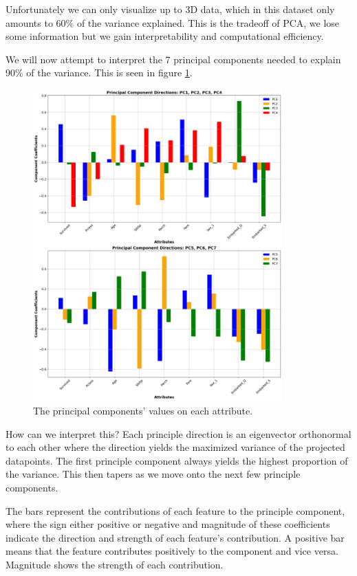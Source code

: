 \documentclass[twoside,11pt]{article}
\begin{document}
Unfortunately we can only visualize up to 3D data, which in this dataset only amounts to 60\% of the variance explained. This is the tradeoff of PCA, we lose some information but we gain interpretability and computational efficiency.

We will now attempt to interpret the 7 principal components needed to explain 90\% of the variance. This is seen in figure \ref{figure:principal-components}.
    
\begin{figure}[h!]
	\centering
	\includegraphics[height=12cm]{analysis_files/analysis_11_1.png}
	\caption{The principal components' values on each attribute.}
	\label{figure:principal-components}
\end{figure}
    
How can we interpret this? Each principle direction is an eigenvector orthonormal to each other where the direction yields the maximized variance of the projected datapoints. The first principle component always yields the highest proportion of the variance. This then tapers as we move onto the next few principle components.

The bars represent the contributions of each feature to the principle component, where the sign either positive or negative and magnitude of these coefficients indicate the direction and strength of each feature's contribution. A positive bar means that the feature contributes positively to the component and vice versa. Magnitude shows the strength of each contribution.
\end{document}
